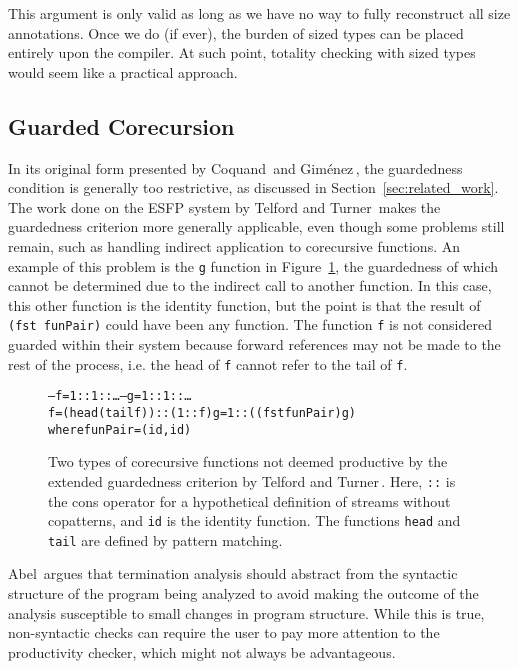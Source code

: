 This argument is only valid as long as we have no way to fully reconstruct all size annotations. Once we do (if ever), the burden of sized types can be placed entirely upon the compiler. At such point, totality checking with sized types would seem like a practical approach.

\subsection{Guarded Corecursion}
In its original form presented by Coquand\,\citep{Coquand94} and Gim\'{e}nez\,\citep{Gimenez95}, the guardedness condition is generally too restrictive, as discussed in Section~\ref{sec:related_work}. The work done on the ESFP system by Telford and Turner\,\citep{Telford97ensuringstreams,Telford98ensuringthe} makes the guardedness criterion more generally applicable, even though some problems still remain, such as handling indirect application to corecursive functions. An example of this problem is the \texttt{g} function in Figure~\ref{fig:TelfordTurnerProblems}, the guardedness of which cannot be determined due to the indirect call to another function. In this case, this other function is the identity function, but the point is that the result of \texttt{(fst~funPair)} could have been any function. The function \texttt{f} is not considered guarded within their system because forward references may not be made to the rest of the process, i.e. the head of \texttt{f} cannot refer to the tail of \texttt{f}.

\begin{figure}
\begin{alltt}
-- f = 1 :: 1 :: \ldots                            -- g = 1 :: 1 :: \ldots
f = (head (tail f)) :: (1 :: f)                 g = 1 :: ((fst funPair) g)
                                                where funPair = (id, id)
\end{alltt}
\caption{Two types of corecursive functions not deemed productive by the extended guardedness criterion by Telford and Turner\,\citep[Section~6.3]{Telford98ensuringthe}. Here, \texttt{::} is the cons operator for a hypothetical definition of streams without copatterns, and \texttt{id} is the identity function. The functions \texttt{head} and \texttt{tail} are defined by pattern matching.} 
\label{fig:TelfordTurnerProblems}
\end{figure}

Abel\,\citep{Abel99terminationchecking} argues that termination analysis should abstract from the syntactic structure of the program being analyzed to avoid making the outcome of the analysis susceptible to small changes in program structure. While this is true, non-syntactic checks can require the user to pay more attention to the productivity checker, which might not always be advantageous. 

